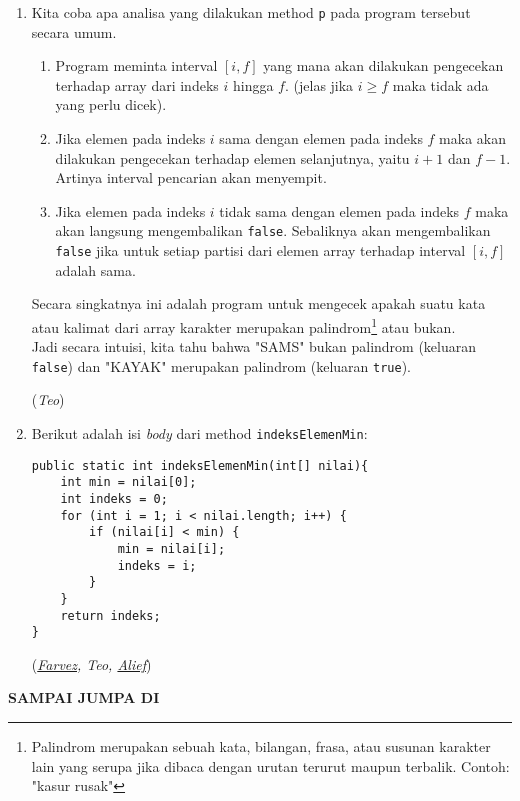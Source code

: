 \documentclass[10pt,openany,letterpaper]{article}
\newcommand{\solvedby}[1]{\begin{flushright} (\textit{#1}) \end{flushright}}
\newcommand{\farvez}{\href{https://onlinegdb.com/HH0MrKZ2R}{Farvez}}
\newcommand{\alief}{\href{https://onlinegdb.com/4ddQhXOTm}{Alief}}
\begin{document}
\begin{enumerate}
    \item Kita coba apa analisa yang dilakukan method \texttt{p} pada program tersebut secara umum.
    \begin{enumerate}[label=\arabic*)]
        \item Program meminta interval $[i,f]$ yang mana akan dilakukan pengecekan terhadap array dari indeks $i$ hingga $f$. (jelas jika $i\geq f$ maka tidak ada yang perlu dicek).
        \item Jika elemen pada indeks $i$ sama dengan elemen pada indeks $f$ maka akan dilakukan pengecekan terhadap elemen selanjutnya, yaitu $i+1$ dan $f-1$. Artinya interval pencarian akan menyempit.
        \item Jika elemen pada indeks $i$ tidak sama dengan elemen pada indeks $f$ maka akan langsung mengembalikan \texttt{false}. Sebaliknya akan mengembalikan \texttt{false} jika untuk setiap partisi dari elemen array terhadap interval $[i,f]$ adalah sama.
    \end{enumerate}
    Secara singkatnya ini adalah program untuk mengecek apakah suatu kata atau kalimat dari array karakter merupakan palindrom\footnote{Palindrom merupakan sebuah kata, bilangan, frasa, atau susunan karakter lain yang serupa jika dibaca dengan urutan terurut maupun terbalik. Contoh: "kasur rusak"} atau bukan. \\
    Jadi secara intuisi, kita tahu bahwa "SAMS" bukan palindrom (keluaran \texttt{false}) dan "KAYAK" merupakan palindrom (keluaran \texttt{true}). 
    \solvedby{Teo}

    \item Berikut adalah isi \textit{body} dari method \texttt{indeksElemenMin}:
    \begin{verbatim}
public static int indeksElemenMin(int[] nilai){
    int min = nilai[0];
    int indeks = 0;
    for (int i = 1; i < nilai.length; i++) {
        if (nilai[i] < min) {
            min = nilai[i];
            indeks = i;
        }
    }
    return indeks;
}
    \end{verbatim}
    \solvedby{\farvez, Teo, \alief}
\end{enumerate}
\begin{center}
    \textbf{SAMPAI JUMPA DI }
\end{center}
\begin{figure}[h!]
    \centering
\end{figure}
\end{document}
